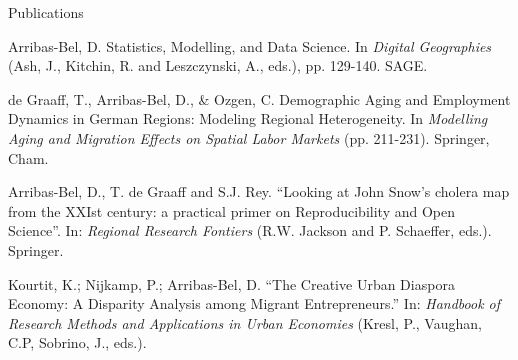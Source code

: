\documentclass[12pt,2up]{article}
\begin{document}
\begin{cv}{}
\begin{cvlist}{Publications}
\item[2018] Arribas-Bel, D. Statistics, Modelling, and Data Science.
    In \textit{Digital Geographies} (Ash, J., Kitchin, R. and Leszczynski, A.,
    eds.), pp. 129-140. SAGE.

\item[] de Graaff, T., Arribas-Bel, D., \& Ozgen, C. Demographic Aging and
    Employment Dynamics in German Regions: Modeling Regional Heterogeneity. In
    \textit{Modelling Aging and Migration Effects on Spatial Labor Markets}
    (pp. 211-231). Springer, Cham.

\item[2017] Arribas-Bel, D., T. de Graaff and S.J. Rey.
    ``Looking at John Snow's cholera map from the XXIst century: a practical
    primer on Reproducibility and Open Science''. In:  \textit{Regional Research Fontiers} (R.W. Jackson and P.
    Schaeffer, eds.). Springer.
\item[2013] Kourtit, K.; Nijkamp, P.; Arribas-Bel, D.  ``The Creative Urban
    Diaspora Economy: A Disparity Analysis among Migrant Entrepreneurs.'' In:
    \textit{Handbook of Research Methods and Applications in Urban Economies}
    (Kresl, P., Vaughan, C.P, Sobrino, J., eds.).


\end{cvlist}
\end{cv}
\end{document}
